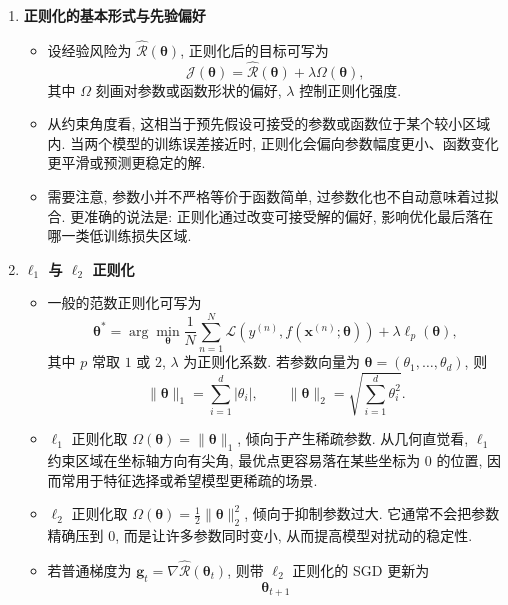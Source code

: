 \documentclass{../nndlcourse}
\begin{document}
\begin{enumerate}
  \item \textbf{正则化的基本形式与先验偏好}
    \begin{itemize}
      \item 设经验风险为 $\hat{\mathcal{R}}(\boldsymbol{\theta})$, 正则化后的目标可写为
      \[
        \mathcal{J}(\boldsymbol{\theta})
        =
        \hat{\mathcal{R}}(\boldsymbol{\theta})
        +
        \lambda \Omega(\boldsymbol{\theta}),
      \]
      其中 $\Omega$ 刻画对参数或函数形状的偏好, $\lambda$ 控制正则化强度.
      \item 从约束角度看, 这相当于预先假设可接受的参数或函数位于某个较小区域内. 当两个模型的训练误差接近时, 正则化会偏向参数幅度更小、函数变化更平滑或预测更稳定的解.
      \item 需要注意, 参数小并不严格等价于函数简单, 过参数化也不自动意味着过拟合. 更准确的说法是: 正则化通过改变可接受解的偏好, 影响优化最后落在哪一类低训练损失区域.
    \end{itemize}
  \item \textbf{$\ell_1$ 与 $\ell_2$ 正则化}
    \begin{itemize}
      \item 一般的范数正则化可写为
      \[
        \boldsymbol{\theta}^*
        =
        \arg\min_{\boldsymbol{\theta}}
        \frac{1}{N}\sum_{n=1}^{N}
        \mathcal{L}\left(
          y^{(n)},
          f\left(\boldsymbol{x}^{(n)};\boldsymbol{\theta}\right)
        \right)
        +
        \lambda\ell_p(\boldsymbol{\theta}),
      \]
      其中 $p$ 常取 $1$ 或 $2$, $\lambda$ 为正则化系数. 若参数向量为 $\boldsymbol{\theta}=(\theta_1,\ldots,\theta_d)$, 则
      \[
        \|\boldsymbol{\theta}\|_1
        =
        \sum_{i=1}^{d}|\theta_i|,
        \qquad
        \|\boldsymbol{\theta}\|_2
        =
        \sqrt{\sum_{i=1}^{d}\theta_i^2}.
      \]
      \item $\ell_1$ 正则化取 $\Omega(\boldsymbol{\theta})=\|\boldsymbol{\theta}\|_1$, 倾向于产生稀疏参数. 从几何直觉看, $\ell_1$ 约束区域在坐标轴方向有尖角, 最优点更容易落在某些坐标为 $0$ 的位置, 因而常用于特征选择或希望模型更稀疏的场景.
      \item $\ell_2$ 正则化取 $\Omega(\boldsymbol{\theta})=\frac{1}{2}\|\boldsymbol{\theta}\|_2^2$, 倾向于抑制参数过大. 它通常不会把参数精确压到 $0$, 而是让许多参数同时变小, 从而提高模型对扰动的稳定性.
      \item 若普通梯度为 $\boldsymbol{g}_t=\nabla\hat{\mathcal{R}}(\boldsymbol{\theta}_t)$, 则带 $\ell_2$ 正则化的 SGD 更新为
      \[
        \boldsymbol{\theta}_{t+1}
\]
\end{itemize}
\end{enumerate}
\end{document}
